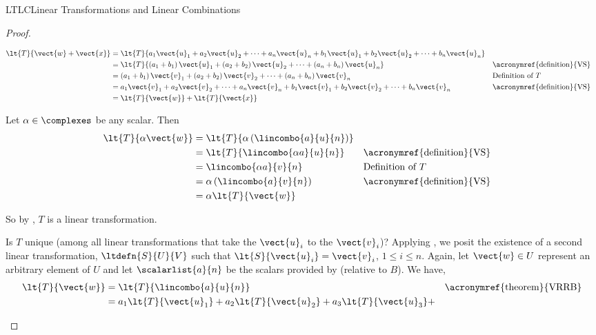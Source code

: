 \begin{subsect}{LTLC}{Linear Transformations and Linear Combinations}
\begin{proof}
\begin{para}
%
\begin{align*}
\lt{T}{\vect{w}+\vect{x}}&=
\lt{T}{
a_1\vect{u}_1+
a_2\vect{u}_2+
\cdots+
a_n\vect{u}_n+
b_1\vect{u}_1+
b_2\vect{u}_2+
\cdots+
b_n\vect{u}_n
}\\
%
&=
\lt{T}{
\left(a_1+b_1\right)\vect{u}_1+
\left(a_2+b_2\right)\vect{u}_2+
\cdots+
\left(a_n+b_n\right)\vect{u}_n
}
&&\text{\acronymref{definition}{VS}}\\
%
&=
\left(a_1+b_1\right)\vect{v}_1+
\left(a_2+b_2\right)\vect{v}_2+
\cdots+
\left(a_n+b_n\right)\vect{v}_n
&&\text{Definition of $T$}\\
%
&=
a_1\vect{v}_1+
a_2\vect{v}_2+
\cdots+
a_n\vect{v}_n+
b_1\vect{v}_1+
b_2\vect{v}_2+
\cdots+
b_n\vect{v}_n
&&\text{\acronymref{definition}{VS}}\\
%
&=\lt{T}{\vect{w}}+\lt{T}{\vect{x}}
%
\end{align*}
\end{para}
%
\begin{para}Let $\alpha\in\complexes$ be any scalar.  Then
%
\begin{align*}
\lt{T}{\alpha\vect{w}}&=
\lt{T}{\alpha\left(\lincombo{a}{u}{n}\right)}\\
%
&=
\lt{T}{\lincombo{\alpha a}{u}{n}}
&&\text{\acronymref{definition}{VS}}\\
%
&=\lincombo{\alpha a}{v}{n}
&&\text{Definition of $T$}\\
%
&=\alpha\left(\lincombo{a}{v}{n}\right)
&&\text{\acronymref{definition}{VS}}\\
%
&=\alpha\lt{T}{\vect{w}}
%
\end{align*}\end{para}
%
\begin{para}So by , $T$ is a linear transformation.\end{para}
%
\begin{para}Is $T$ unique (among all linear transformations that take the $\vect{u}_i$ to the $\vect{v}_i$)?  Applying , we posit the existence of a second linear transformation, $\ltdefn{S}{U}{V}$ such that $\lt{S}{\vect{u}_i}=\vect{v}_i$, $1\leq i\leq n$.  Again, let $\vect{w}\in U$ represent an arbitrary element of $U$ and let $\scalarlist{a}{n}$ be the scalars provided by  (relative to $B$).  We have,
%
\begin{align*}
\lt{T}{\vect{w}}&=
\lt{T}{\lincombo{a}{u}{n}}
&&\text{\acronymref{theorem}{VRRB}}\\
%
&=
a_1\lt{T}{\vect{u}_1}+
a_2\lt{T}{\vect{u}_2}+
a_3\lt{T}{\vect{u}_3}+

\end{align*}
\end{para}
\end{proof}
\end{subsect}
